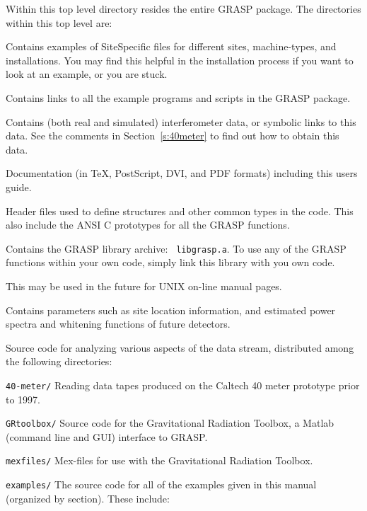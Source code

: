 Within this top level directory resides the entire GRASP package.  The
directories within this top level are:
\begin{description}
\item[{\tt Examples\_SiteSpecific}] Contains examples of SiteSpecific
files for different sites, machine-types, and installations.  You may
find this helpful in the installation process if you want to look at
an example, or you are stuck.
\item[{\tt bin/}] Contains links to all the example programs and
scripts in the GRASP package.
\item[{\tt data/}] Contains (both real and simulated) interferometer data,
  or symbolic links to this data.  See the comments in Section~\ref{s:40meter}
  to find out how to obtain this data.
\item[{\tt doc/}] Documentation (in TeX, PostScript, DVI, and PDF formats)
   including this users guide.
\item[{\tt include/}] Header files used to define structures and other
   common types in the code.
This also include the ANSI C prototypes for all the GRASP functions.
\item[{\tt lib/}] Contains the GRASP library archive: {\tt
libgrasp.a}. To use any of the GRASP functions within your own code,
simply link this library with you own code.
\item[{\tt man/}] This may be used in the future for UNIX on-line manual pages.
\item[{\tt parameters/}] Contains parameters such as site location information,
  and estimated power spectra and whitening functions of future detectors.
\item[{\tt src/}] Source code for analyzing various aspects of the
data stream, distributed among the following directories:
\begin{description}
\item{\tt 40-meter/} Reading data tapes produced on the Caltech 40 meter
  prototype prior to 1997.
\item{\tt GRtoolbox/} Source code for the Gravitational Radiation Toolbox, a
Matlab (command line and GUI) interface to GRASP.
\begin{description}
\item{\tt mexfiles/}
Mex-files for use with the Gravitational Radiation Toolbox.
\end{description}
\item{\tt examples/} The source code for all of the examples given in
this manual (organized by section).  These include:

\end{description}
\end{description}
